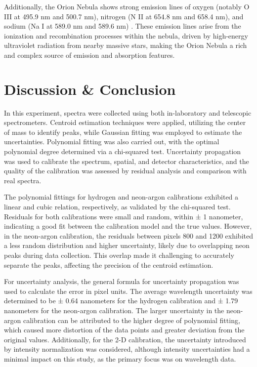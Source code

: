 \documentclass[10pt, preprint]{aastex}
\begin{document}
Additionally, the Orion Nebula shows strong emission lines of oxygen (notably O III at 495.9 nm and 500.7 nm), nitrogen (N II at 654.8 nm and 658.4 nm), and sodium (Na I at 589.0 nm and 589.6 nm) \cite{adsabs}. These emission lines arise from the ionization and recombination processes within the nebula, driven by high-energy ultraviolet radiation from nearby massive stars, making the Orion Nebula a rich and complex source of emission and absorption features.

\section{Discussion \& Conclusion}\label{sec:conclusion}

In this experiment, spectra were collected using both in-laboratory and telescopic spectrometers. Centroid estimation techniques were applied, utilizing the center of mass to identify peaks, while Gaussian fitting was employed to estimate the uncertainties. Polynomial fitting was also carried out, with the optimal polynomial degree determined via a chi-squared test. Uncertainty propagation was used to calibrate the spectrum, spatial, and detector characteristics, and the quality of the calibration was assessed by residual analysis and comparison with real spectra.

The polynomial fittings for hydrogen and neon-argon calibrations exhibited a linear and cubic relation, respectively, as validated by the chi-squared test. Residuals for both calibrations were small and random, within ± 1 nanometer, indicating a good fit between the calibration model and the true values. However, in the neon-argon calibration, the residuals between pixels 800 and 1200 exhibited a less random distribution and higher uncertainty, likely due to overlapping neon peaks during data collection. This overlap made it challenging to accurately separate the peaks, affecting the precision of the centroid estimation.

For uncertainty analysis, the general formula for uncertainty propagation was used to calculate the error in pixel units. The average wavelength uncertainty was determined to be ± 0.64 nanometers for the hydrogen calibration and ± 1.79 nanometers for the neon-argon calibration. The larger uncertainty in the neon-argon calibration can be attributed to the higher degree of polynomial fitting, which caused more distortion of the data points and greater deviation from the original values. Additionally, for the 2-D calibration, the uncertainty introduced by intensity normalization was considered, although intensity uncertainties had a minimal impact on this study, as the primary focus was on wavelength data.
\end{document}
